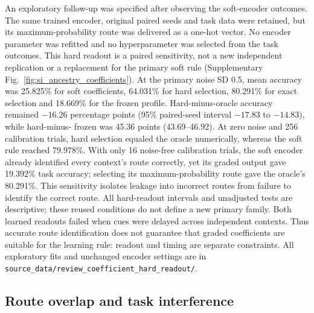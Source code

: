 An exploratory follow-up was specified after observing the soft-encoder
outcomes. The same trained encoder, original paired seeds and task data were
retained, but its maximum-probability route was delivered as a one-hot vector.
No encoder parameter was refitted and no hyperparameter was selected from
the task outcomes. This hard readout is a paired sensitivity, not a new
independent replication or a replacement for the primary soft rule
(Supplementary Fig.~\ref{fig:si_ancestry_coefficients}). At the primary
noise SD 0.5, mean accuracy was 25.825\% for soft coefficients, 64.031\%
for hard selection, 80.291\% for exact selection and 18.669\% for the
frozen profile. Hard-minus-oracle accuracy remained $-16.26$ percentage
points (95\% paired-seed interval $-17.83$ to $-14.83$), while hard-minus-
frozen was 45.36 points (43.69--46.92). At zero noise and 256 calibration
trials, hard selection equaled the oracle numerically, whereas the soft rule
reached 79.978\%. With only 16 noise-free calibration trials, the soft
encoder already identified every context's route correctly, yet its graded
output gave 19.392\% task accuracy; selecting its maximum-probability route
gave the oracle's 80.291\%. This sensitivity isolates leakage into incorrect
routes from failure to identify the correct route. All hard-readout intervals and
unadjusted tests are descriptive; these reused conditions do not define a
new primary family. Both learned readouts failed when cues were delayed across
independent contexts. Thus accurate route identification does not guarantee
that graded coefficients are suitable for the learning rule: readout and
timing are separate constraints. All exploratory fits and unchanged encoder
settings are in \texttt{source\_data/review\_coefficient\_hard\_readout/}.

\subsection{Route overlap and task interference}

